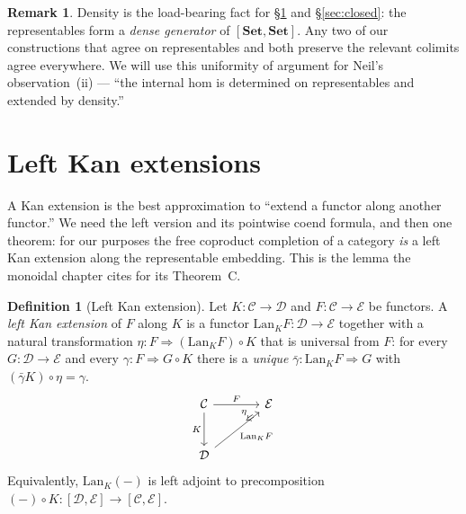 \documentclass[11pt]{article}
\theoremstyle{plain}
\theoremstyle{definition}
\newtheorem{definition}[theorem]{Definition}
\newtheorem{remark}[theorem]{Remark}
\newcommand{\Set}{\mathbf{Set}}
\newcommand{\Lan}{\mathrm{Lan}}
\begin{document}
\begin{remark}
\label{rem:densegen}
Density is the load-bearing fact for \S\ref{sec:kan} and \S\ref{sec:closed}: the
representables form a \emph{dense generator} of $[\Set,\Set]$. Any two of our
constructions that agree on representables and both preserve the relevant
colimits agree everywhere. We will use this uniformity of argument for Neil's
observation~(ii) --- ``the internal hom is determined on representables and
extended by density.''
\end{remark}

\section{Left Kan extensions}
\label{sec:kan}

A Kan extension is the best approximation to ``extend a functor along another
functor.'' We need the left version and its pointwise coend formula, and then one
theorem: for our purposes the free coproduct completion of a category \emph{is} a
left Kan extension along the representable embedding. This is the lemma the
monoidal chapter cites for its Theorem~C.

\begin{definition}[Left Kan extension]
\label{def:lan}
Let $K\colon\mathcal{C}\to\mathcal{D}$ and $F\colon\mathcal{C}\to\mathcal{E}$ be
functors. A \emph{left Kan extension} of $F$ along $K$ is a functor
$\Lan_{K}F\colon\mathcal{D}\to\mathcal{E}$ together with a natural transformation
$\eta\colon F\Rightarrow (\Lan_{K}F)\circ K$ that is universal from $F$: for every
$G\colon\mathcal{D}\to\mathcal{E}$ and every $\gamma\colon F\Rightarrow G\circ K$
there is a \emph{unique} $\bar\gamma\colon\Lan_{K}F\Rightarrow G$ with
$(\bar\gamma K)\circ\eta = \gamma$.
\[
\begin{tikzcd}[column sep=large,row sep=large]
  \mathcal{C} \arrow[r,"F"] \arrow[d,"K"'] & \mathcal{E}\\
  \mathcal{D} \arrow[ur,"\Lan_{K}F"',""{name=L,above}] &
  \arrow[from=1-1,to=2-1,phantom]
  \arrow[Rightarrow,from=1-2,to=L,"\eta"',shorten <=6pt,shorten >=6pt]
\end{tikzcd}
\]
Equivalently, $\Lan_{K}(-)$ is left adjoint to precomposition
$(-)\circ K\colon[\mathcal{D},\mathcal{E}]\to[\mathcal{C},\mathcal{E}]$.
\end{definition}
\end{document}
